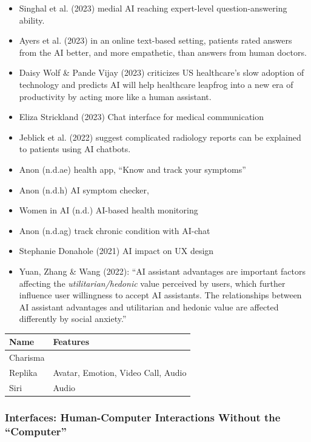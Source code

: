 \documentclass[
  letterpaper,
  DIV=11,
  numbers=noendperiod]{scrartcl}
\begin{document}
\begin{itemize}
\item
  Singhal et al. (2023) medial AI reaching expert-level
  question-answering ability.
\item
  Ayers et al. (2023) in an online text-based setting, patients rated
  answers from the AI better, and more empathetic, than answers from
  human doctors.
\item
  Daisy Wolf \& Pande Vijay (2023) criticizes US healthcare's slow
  adoption of technology and predicts AI will help healthcare leapfrog
  into a new era of productivity by acting more like a human assistant.
\item
  Eliza Strickland (2023) Chat interface for medical communication
\item
  Jeblick et al. (2022) suggest complicated radiology reports can be
  explained to patients using AI chatbots.
\item
  Anon (n.d.ae) health app, ``Know and track your symptoms''
\item
  Anon (n.d.h) AI symptom checker,
\item
  Women in AI (n.d.) AI-based health monitoring
\item
  Anon (n.d.ag) track chronic condition with AI-chat
\item
  Stephanie Donahole (2021) AI impact on UX design
\item
  Yuan, Zhang \& Wang (2022): ``AI assistant advantages are important
  factors affecting the \emph{utilitarian/hedonic} value perceived by
  users, which further influence user willingness to accept AI
  assistants. The relationships between AI assistant advantages and
  utilitarian and hedonic value are affected differently by social
  anxiety.''
\end{itemize}

\begin{longtable}[]{@{}ll@{}}
\toprule\noalign{}
Name & Features \\
\midrule\noalign{}
\endhead
\bottomrule\noalign{}
\endlastfoot
Charisma & \\
Replika & Avatar, Emotion, Video Call, Audio \\
Siri & Audio \\
\end{longtable}

\subsubsection{Interfaces: Human-Computer Interactions Without the
``Computer''}\label{interfaces-human-computer-interactions-without-the-computer}
\end{document}
